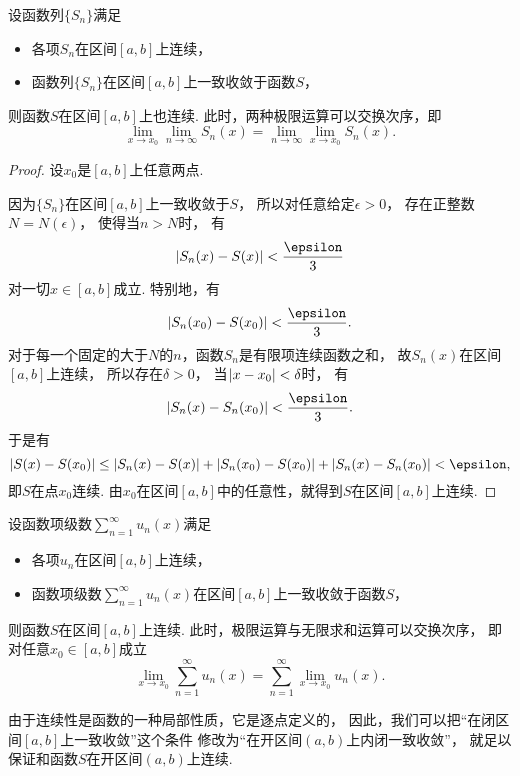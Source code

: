 \begin{theorem}\label{theorem:无穷级数.一致收敛级数的基本性质1}
设函数列\(\{S_n\}\)满足\begin{itemize}
	\item 各项\(S_n\)在区间\([a,b]\)上连续，
	\item 函数列\(\{S_n\}\)在区间\([a,b]\)上一致收敛于函数\(S\)，
\end{itemize}
则函数\(S\)在区间\([a,b]\)上也连续.
此时，两种极限运算可以交换次序，即\[
	\lim_{x \to x_0} \lim_{n\to\infty} S_n(x)
	= \lim_{n\to\infty} \lim_{x \to x_0} S_n(x).
\]
\begin{proof}
设\(x_0\)是\([a,b]\)上任意两点.

因为\(\{S_n\}\)在区间\([a,b]\)上一致收敛于\(S\)，
所以对任意给定\(\epsilon>0\)，
存在正整数\(N = N(\epsilon)\)，
使得当\(n>N\)时，
有\[
	\abs{S_n(x) - S(x)} < \frac\epsilon3
\]对一切\(x\in[a,b]\)成立.
特别地，有\[
	\abs{S_n(x_0) - S(x_0)} < \frac\epsilon3.
\]
对于每一个固定的大于\(N\)的\(n\)，函数\(S_n\)是有限项连续函数之和，
故\(S_n(x)\)在区间\([a,b]\)上连续，
所以存在\(\delta>0\)，
当\(\abs{x - x_0} < \delta\)时，
有\[
	\abs{S_n(x) - S_n(x_0)} < \frac\epsilon3.
\]
于是有\[
	\abs{S(x) - S(x_0)}
	\leq \abs{S_n(x) - S(x)}
		+ \abs{S_n(x_0) - S(x_0)}
		+ \abs{S_n(x) - S_n(x_0)}
	< \epsilon,
\]
即\(S\)在点\(x_0\)连续.
由\(x_0\)在区间\([a,b]\)中的任意性，就得到\(S\)在区间\([a,b]\)上连续.
\end{proof}
\end{theorem}
\begin{theorem}
设函数项级数\(\sum_{n=1}^\infty u_n(x)\)满足\begin{itemize}
	\item 各项\(u_n\)在区间\([a,b]\)上连续，
	\item 函数项级数\(\sum_{n=1}^\infty u_n(x)\)在区间\([a,b]\)上一致收敛于函数\(S\)，
\end{itemize}
则函数\(S\)在区间\([a,b]\)上连续.
此时，极限运算与无限求和运算可以交换次序，
即对任意\(x_0\in[a,b]\)成立\[
	\lim_{x \to x_0} \sum_{n=1}^\infty u_n(x)
	= \sum_{n=1}^\infty \lim_{x \to x_0} u_n(x).
\]
\end{theorem}
由于连续性是函数的一种局部性质，它是逐点定义的，
因此，我们可以把“在闭区间\([a,b]\)上一致收敛”这个条件
修改为“在开区间\((a,b)\)上内闭一致收敛”，
就足以保证和函数\(S\)在开区间\((a,b)\)上连续.
